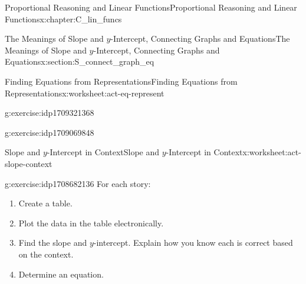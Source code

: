 \documentclass[oneside,10pt,]{book}
\newlength{\fillinmaxwidth}
\newlength{\fillincontract}
\newlength{\fillinheight}
\newcommand{\fillintext}[1]{%
\setlength{\fillinmaxwidth}{#1em*\real{0.5}}%
\setlength{\fillincontract}{#1em*\real{0.5}*\real{0.2}}%
\setlength{\fillinheight}{\heightof{\strut}+1.2pt}%
\strut\nobreak\leaders\vbox{\hrule width 0.3pt height 0.3pt \vskip -1.2pt}\hskip 1\fillinmaxwidth minus \fillincontract\nobreak\strut%
}
\newcommand{\lititle}[1]{{\slshape#1}}
\numberwithin{equation}{chapter}
\begin{document}
\begin{chapterptx}{Proportional Reasoning and Linear Functions}{}{Proportional Reasoning and Linear Functions}{}{}{x:chapter:C_lin_funcs}
\begin{sectionptx}{The Meanings of Slope and \(y\)-Intercept, Connecting Graphs and Equations}{}{The Meanings of Slope and \(y\)-Intercept, Connecting Graphs and Equations}{}{}{x:section:S_connect_graph_eq}
\begin{worksheet-subsection}{Finding Equations from Representations}{}{Finding Equations from Representations}{}{}{x:worksheet:act-eq-represent}
\begin{divisionexercise}{5}{}{}{g:exercise:idp1709321368}
\end{divisionexercise}%
\begin{divisionexercise}{6}{}{}{g:exercise:idp1709069848}%
\end{divisionexercise}%
\end{worksheet-subsection}
\restoregeometry
%
%
\typeout{************************************************}
\typeout{************************************************}
%
\begin{worksheet-subsection}{Slope and \(y\)-Intercept in Context}{}{Slope and \(y\)-Intercept in Context}{}{}{x:worksheet:act-slope-context}
\begin{divisionexercise}{1}{}{}{g:exercise:idp1708682136}%
For each story:%
\begin{enumerate}[label=(\alph*)]
\item{}Create a table.%
\item\hypertarget{x:li:slope-context-directions-b}{}Plot the data in the table electronically.%
\item{}Find the slope and \(y\)-intercept. Explain how you know each is correct based on the context.%
\item{}Determine an equation.%

\end{enumerate}
\end{divisionexercise}
\end{worksheet-subsection}
\end{sectionptx}
\end{chapterptx}
\end{document}

